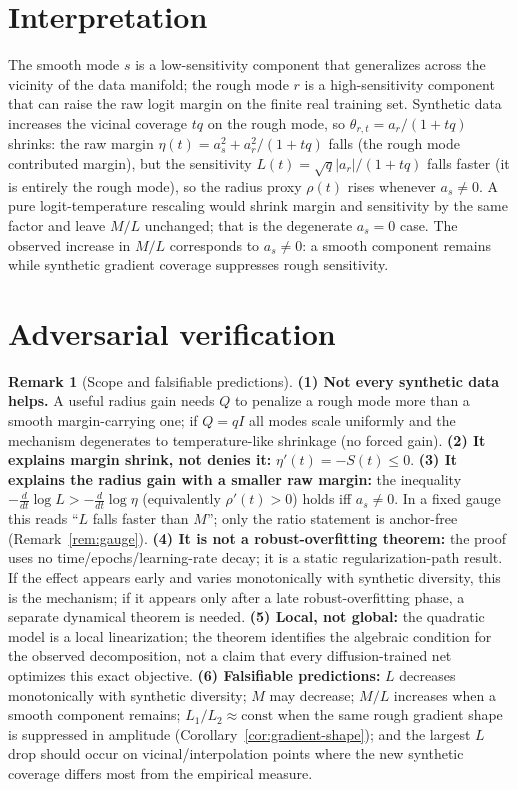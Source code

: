 \documentclass[11pt]{article}
\theoremstyle{definition}
\newtheorem{remark}{Remark}
\begin{document}
\section{Interpretation}
The smooth mode $s$ is a low-sensitivity component that generalizes across the vicinity of the data manifold;
the rough mode $r$ is a high-sensitivity component that can raise the raw logit margin on the finite real
training set. Synthetic data increases the vicinal coverage $tq$ on the rough mode, so $\theta_{r,t}=a_r/(1+tq)$
shrinks: the raw margin $\eta(t)=a_s^2+a_r^2/(1+tq)$ falls (the rough mode contributed margin), but the
sensitivity $L(t)=\sqrt q|a_r|/(1+tq)$ falls faster (it is entirely the rough mode), so the radius proxy
$\rho(t)$ rises whenever $a_s\neq0$. A pure logit-temperature rescaling would shrink margin and sensitivity by
the same factor and leave $M/L$ unchanged; that is the degenerate $a_s=0$ case. The observed increase in $M/L$
corresponds to $a_s\neq0$: a smooth component remains while synthetic gradient coverage suppresses rough sensitivity.

\section{Adversarial verification}
\begin{remark}[Scope and falsifiable predictions]\label{rem:av}
\textbf{(1) Not every synthetic data helps.} A useful radius gain needs $Q$ to penalize a rough mode more than a
smooth margin-carrying one; if $Q=qI$ all modes scale uniformly and the mechanism degenerates to
temperature-like shrinkage (no forced gain). \textbf{(2) It explains margin shrink, not denies it:}
$\eta'(t)=-S(t)\le0$. \textbf{(3) It explains the radius gain with a smaller raw margin:} the inequality
$-\tfrac{d}{dt}\log L>-\tfrac{d}{dt}\log\eta$ (equivalently $\rho'(t)>0$) holds iff $a_s\neq0$. In a fixed
gauge this reads ``$L$ falls faster than $M$''; only the ratio statement is anchor-free
(Remark~\ref{rem:gauge}). \textbf{(4) It is not a
robust-overfitting theorem:} the proof uses no time/epochs/learning-rate decay; it is a static
regularization-path result. If the effect appears early and varies monotonically with synthetic diversity, this
is the mechanism; if it appears only after a late robust-overfitting phase, a separate dynamical theorem is
needed. \textbf{(5) Local, not global:} the quadratic model is a local linearization; the theorem identifies the
algebraic condition for the observed decomposition, not a claim that every diffusion-trained net optimizes this
exact objective. \textbf{(6) Falsifiable predictions:} $L$ decreases monotonically with synthetic diversity; $M$
may decrease; $M/L$ increases when a smooth component remains; $L_1/L_2\approx\text{const}$ when the same rough
gradient shape is suppressed in amplitude (Corollary~\ref{cor:gradient-shape}); and the largest $L$ drop should
occur on vicinal/interpolation points where the new synthetic coverage differs most from the empirical measure.
\end{remark}
\end{document}
